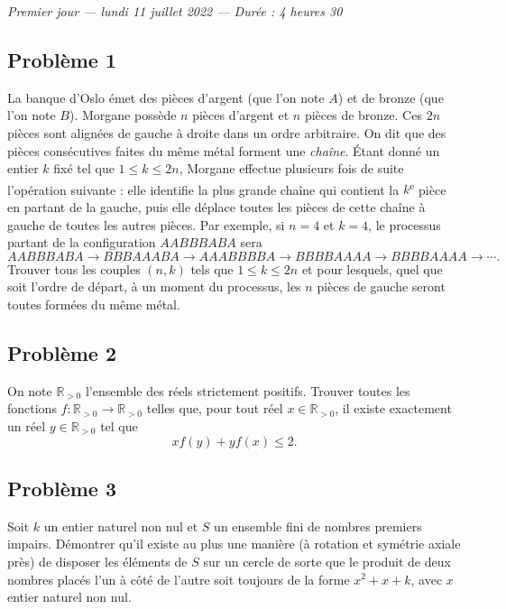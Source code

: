 
\begin{center}
  \emph{Premier jour --- lundi 11 juillet 2022 --- Durée : 4 heures 30}
\end{center}

\subsection*{Problème 1}
La banque d'Oslo émet des pièces d'argent (que l'on note $A$) et de bronze (que l'on note $B$). Morgane
possède $n$ pièces d'argent et $n$ pièces de bronze. Ces $2n$ pièces sont alignées de gauche à droite dans un
ordre arbitraire. On dit que des pièces consécutives faites du même métal forment une \emph{chaîne}. Étant
donné un entier $k$ fixé tel que $1 \leqslant k \leqslant 2n$, Morgane effectue plusieurs fois de suite
l'opération suivante : elle identifie la plus grande chaîne qui contient la $k$\textsuperscript{e} pièce en
partant de la gauche, puis elle déplace toutes les pièces de cette chaîne à gauche de toutes les autres pièces.
Par exemple, si $n = 4$ et $k = 4$, le processus partant de la configuration $AABBBABA$ sera
\[
AABBBABA \to BBBAAABA \to AAABBBBA \to BBBBAAAA \to BBBBAAAA \to \cdots.
\]
Trouver tous les couples $(n, k)$ tels que $1 \leqslant k \leqslant 2n$ et pour lesquels, quel que soit
l'ordre de départ, à un moment du processus, les $n$ pièces de gauche seront toutes formées du même métal.

\subsection*{Problème 2}
On note $\mathbb{R}_{>0}$ l'ensemble des réels strictement positifs. Trouver toutes les fonctions
$f \colon \mathbb{R}_{>0} \to \mathbb{R}_{>0}$ telles que, pour tout réel $x \in \mathbb{R}_{>0}$, il existe
exactement un réel $y \in \mathbb{R}_{>0}$ tel que
\[
x f(y) + y f(x) \leqslant 2.
\]

\subsection*{Problème 3}
Soit $k$ un entier naturel non nul et $S$ un ensemble fini de nombres premiers impairs. Démontrer qu'il
existe au plus une manière (à rotation et symétrie axiale près) de disposer les éléments de $S$ sur un
cercle de sorte que le produit de deux nombres placés l'un à côté de l'autre soit toujours de la forme
$x^2 + x + k$, avec $x$ entier naturel non nul.

